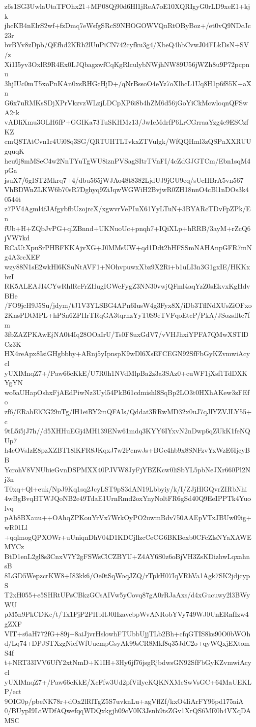 z6s1SG3UwlaUtaTFOhx21+MP08Qj90d6Hl1jReA7oE10XQRIgyG0rLD9xeE1+kjk
jhcKB4nElrS2wf+fzDmq7eWsfgSRcS9NHOGOWVQnRtOByBoz+/et0vQ9NDcJc23r
bvBYv8zDpb/QEfhd2KRb2lUuPiCN742cyfku3g4/XbeQ4hbCvwJ04FLkDsN+SV/z
Xi1I5yv3OxlR9R4Ex0LJQbagzwfCqKgRlculybNWjhNW89U56jWZh8u9P72pcpnu
3hjIUc0mT5xoPnKAn0xsRHGcHjD+/qNrBssoO4eYz7oXlhcL1Uq8H1p6f85K+aXn
G6x7uRMKsSDjXPrVkzvzWLzjLDCpXP6i8b4hZM6d56jGoYiCkMcwloqnQFSwA2tk
vADliXmu3OLH6fP+GGIKa73TuSKHMz13/JwIeMdrfP6LrCGrraaYzg4e9ESCzfKZ
cmQ8TAtCvn1r4Ui08q3SG/QRTUHTLTvkxZTVulgk/WfQQHml3zQSPnXXRUUgquqK
heu6j8mMSeC4w2NnTYuTgWU8iznPVSagSItrTVnFI/4cZdGJGTCm/Ebn1sqM4pGa
jsuX7/6gIST2Mkrq7+4/dbu565jWJAo48t8382LjdUJ9jGU9eq/sUeHBrA5vn567
VhBDWnZLKW6b70sR7Dghyq9ZiJqwWGWiH2BvjwR0ZH18nnO4cBl1nDOs3k40544t
z7PV4Agml4fJAfgybfbUzojrcX/xgwvrVePIuX61YyLTuN+3BYARcTDvFpZPk/En
fUb+H+ZQbJvPG+qlZBnnd+UKNuoUc+pnqh7+IQiXLp+hRRB/3ayM+rZcQ6jVW7kd
RCaUtXpuSrPHBFKKAjvXG+J0MMsUW+qd1Ddt2bHFSSmNAHAnpGFR7mNg4A3rcXEF
wzy88N1sE2wkHl6KSuNtAVF1+NOhvpuwxXbz9X2Ri+b1uLI3n3G1gxIE/HKKxbzI
RK5ALEAJI4CYwRhlReFrZHugIGWeFygZ3NN30vwjQFml4aqYzZ0sEkvxKgHdvBHe
/FO9jcH9J5Su/jdym/tJ1V3YLSBG4APn6IusW4g3Fyx8X/iDb3TflNdXUsZiOFxo
2KnsPDtMPL+hPSn6ZPHrTRqGA3tqrnzYyT0S9eTVFqoEtcP/PkA/JSozslIte7fm
3fbZAZPKAwEjNA0t4Iq28OOaIrU/Ts0F8uxGdV7/vVHJhxiYPFA7QMwXSTlDCz3K
HX4reApx8IsiGHgbbby+ARnj5yIpnspK9wDl6XsEFCEGN92SfFbGyKZvmwiAcycl
yUXlMnqZ7+/Paw66cKkE/U7R0h1NVdMlpBa2z3a3SAz0+cuWF1jXsf1TdDXKYgYN
wo5aUHapOshxFjAEdPiwNz3Uyl54PkB61cdmishl8SqBp2LO3t0HXhAKew3zFEfo
zf6/ERahElCG29uTg/lH1eiRY2mQFAIs/Qddat3RRwMD32x0uJ7qJlYZVJLY55+c
9tL5i5jJ7h//d5XHHuEGj4MH139ENw61mdq3KYY6IYxvN2nDwp6qZUkK1feNQUp7
h4cOVsIzE8pzXZBT18lKFR8JKqxJ7w2PcnwJs+BGe4hb9x8SNFzvYxWzE6IjcyBB
YcrohV8VNUbieGvnDSPMXX40PJVW8JyFjYBZKcw0liSbYL5pbNeJXr660Pl2Nj3n
T0xq+Ql+euk/NpJ9Kq1sq2JcyLST9pS3dAN19Lbbyiy/k/I/ZJjHlGQvrZIRbNhi
4wBgBvqHTWJQoNB2e49TdaE1UrnRmd2oxYnyNoltFR6gSd40Q9EeIPPTk4Yuolvq
pAb8BXauu++OAhqZPKouYrVx7WrkOyPO2uwmBdv750AAEpVTxJBUw09ig+wR01Ll
+qqlmogQPXOWr+uUniqnDhV04D1KDCjllzcCeCG6BKBexb0CFcZlsNYaXAWEMYCz
BtD1enL2gl8s3CnxV7Y2gFSWsClCZBYU+Z4AY6S0z6oBjVH3ZsKDizhwLqxahnsB
8LGD5WepzcrKW8+I83kk6/Oe0tSqWoqJZQ/rTpkH07IqVRhVa1Agk7SK2jdjcypS
T2xH055+e5SHRtUPsCBkzGCsAIVw5yCovq87gA0rRJaAxs/d4xGucuwy2l3BWyWU
pM5n9PkCDKc/t/Tx1PjP2PHbHJ0HzavebpWvANRobYVy749WJ0UnERnfIzw4gZXF
VIT+s6aH772fG+89j+8aiJjvrHslowhFTUbbUjjTLb2Bh+cfqGTIS8ks90O0bWOh
d/Lq74+DPJSTXzgNiefWfUucmpGsyAk99sCR8Mkf8q35JdC2o+qyWQxjEXtomS4f
t+NRT33IVV6UfY2xtNmD+K1IH+3Hy6jf76jsgRjbdwsGN92SfFbGyKZvmwiAcycl
yUXlMnqZ7+/Paw66cKkE/XcFfw3Ud2pfViIycKQKNXMcSwVsGC+64MaUEKLP/ect
9OIG0p/pbeNK78r+dOx2lRlTgZ5S7uvknLu+agVflZf/kxO4IiArFY96pd175aiA
0/BUypI9LtWDfAQwefqqWDQxkgjh09cV0K3Jsnb9tsZGv1XrQS6ME0h4VXqDAMSC
